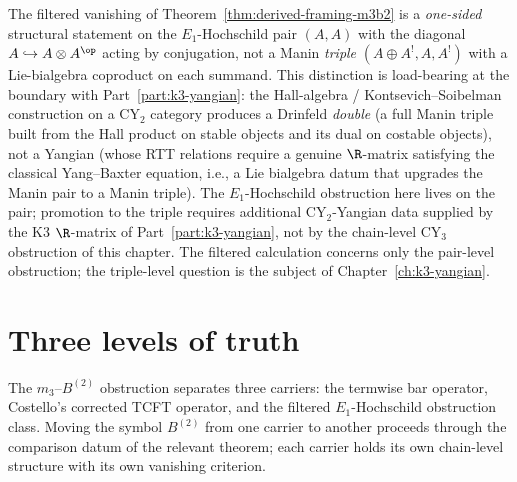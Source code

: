 \begin{remark}
\label{rem:m3b2-manin-pair}
The filtered vanishing of
Theorem~\ref{thm:derived-framing-m3b2} is a \emph{one-sided}
structural statement on the $E_1$-Hochschild pair
$(A, A)$ with the diagonal $A \hookrightarrow A \otimes A^{\op}$
acting by conjugation, not a Manin \emph{triple}
$(A \oplus A^!, A, A^!)$ with a Lie-bialgebra coproduct
on each summand. This distinction is load-bearing at the
boundary with Part~\ref{part:k3-yangian}: the Hall-algebra /
Kontsevich--Soibelman construction on a CY$_2$ category produces
a Drinfeld \emph{double} (a full Manin triple built from the Hall
product on stable objects and its dual on costable objects), not
a Yangian (whose RTT relations require a genuine $\R$-matrix
satisfying the classical Yang--Baxter equation, i.e., a Lie
bialgebra datum that upgrades the Manin pair to a Manin triple).
The $E_1$-Hochschild obstruction here lives on the pair; promotion
to the triple requires additional CY$_2$-Yangian data supplied by
the K3 $\R$-matrix of Part~\ref{part:k3-yangian}, not by the
chain-level CY$_3$ obstruction of this chapter. The filtered
calculation concerns only the pair-level obstruction; the
triple-level question is the subject of
Chapter~\ref{ch:k3-yangian}.
\end{remark}


\section{Three levels of truth}
\label{sec:m3b2-three-levels}

The $m_3$--$B^{(2)}$ obstruction separates three carriers: the
termwise bar operator, Costello's corrected TCFT operator, and the
filtered $E_1$-Hochschild obstruction class. Moving the symbol
$B^{(2)}$ from one carrier to another proceeds through the
comparison datum of the relevant theorem; each carrier holds its own
chain-level structure with its own vanishing criterion.

